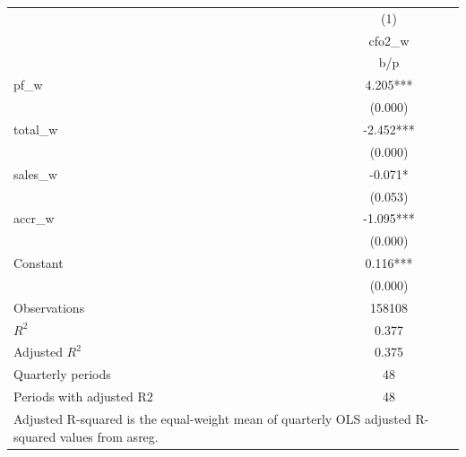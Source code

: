 {
\def\sym#1{\ifmmode^{#1}\else\(^{#1}\)\fi}
\begin{tabular}{l*{1}{c}}
\hline\hline
                    &\multicolumn{1}{c}{(1)}\\
                    &\multicolumn{1}{c}{cfo2\_w}\\
                    &         b/p   \\
\hline
pf\_w                &       4.205***\\
                    &     (0.000)   \\
total\_w             &      -2.452***\\
                    &     (0.000)   \\
sales\_w             &      -0.071*  \\
                    &     (0.053)   \\
accr\_w              &      -1.095***\\
                    &     (0.000)   \\
Constant            &       0.116***\\
                    &     (0.000)   \\
\hline
Observations        &      158108   \\
\(R^{2}\)           &       0.377   \\
Adjusted \(R^{2}\)  &       0.375   \\
Quarterly periods   &          48   \\
Periods with adjusted R2&          48   \\
\hline\hline
\multicolumn{2}{l}{\footnotesize Adjusted R-squared is the equal-weight mean of quarterly OLS adjusted R-squared values from asreg.}\\
\end{tabular}
}
